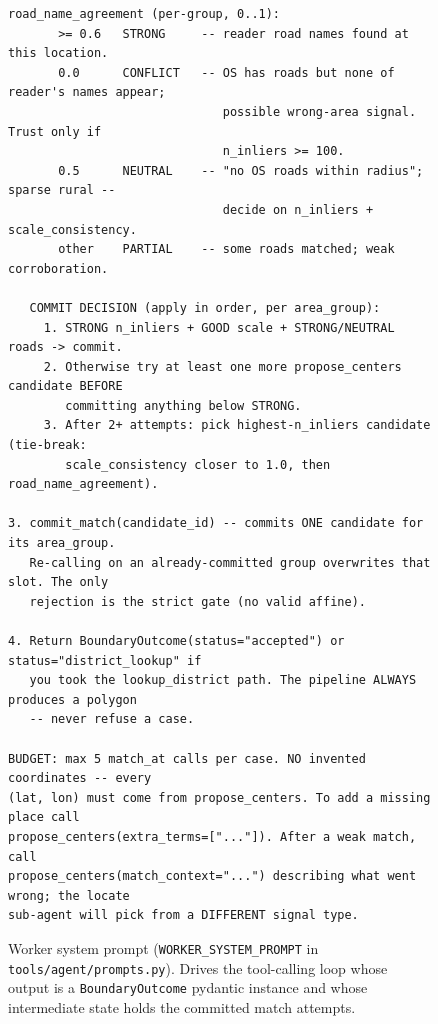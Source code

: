 \documentclass[11pt]{article}
\begin{document}
\begin{figure}[t]
\begin{Verbatim}[frame=single,fontsize=\footnotesize,breaklines=true,breakanywhere=true,xleftmargin=4pt,xrightmargin=4pt]
     road_name_agreement (per-group, 0..1):
       >= 0.6   STRONG     -- reader road names found at this location.
       0.0      CONFLICT   -- OS has roads but none of reader's names appear;
                              possible wrong-area signal. Trust only if
                              n_inliers >= 100.
       0.5      NEUTRAL    -- "no OS roads within radius"; sparse rural --
                              decide on n_inliers + scale_consistency.
       other    PARTIAL    -- some roads matched; weak corroboration.

   COMMIT DECISION (apply in order, per area_group):
     1. STRONG n_inliers + GOOD scale + STRONG/NEUTRAL roads -> commit.
     2. Otherwise try at least one more propose_centers candidate BEFORE
        committing anything below STRONG.
     3. After 2+ attempts: pick highest-n_inliers candidate (tie-break:
        scale_consistency closer to 1.0, then road_name_agreement).

3. commit_match(candidate_id) -- commits ONE candidate for its area_group.
   Re-calling on an already-committed group overwrites that slot. The only
   rejection is the strict gate (no valid affine).

4. Return BoundaryOutcome(status="accepted") or status="district_lookup" if
   you took the lookup_district path. The pipeline ALWAYS produces a polygon
   -- never refuse a case.

BUDGET: max 5 match_at calls per case. NO invented coordinates -- every
(lat, lon) must come from propose_centers. To add a missing place call
propose_centers(extra_terms=["..."]). After a weak match, call
propose_centers(match_context="...") describing what went wrong; the locate
sub-agent will pick from a DIFFERENT signal type.
\end{Verbatim}
\caption{Worker system prompt (\texttt{WORKER\_SYSTEM\_PROMPT} in \texttt{tools/agent/prompts.py}). Drives the tool-calling loop whose output is a \texttt{BoundaryOutcome} pydantic instance and whose intermediate state holds the committed match attempts.}
\label{fig:worker-prompt}
\end{figure}
\end{document}
